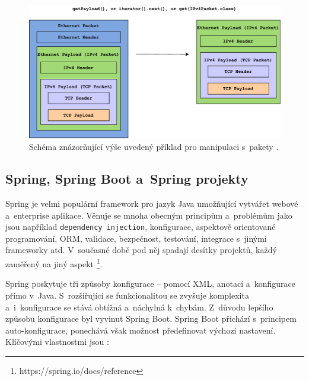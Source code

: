 \begin{figure}[!h]
  \centering
  \includegraphics[width=15cm]{template-fig/Pcap4JExample.pdf}
  \caption{Schéma znázorňující výše uvedený příklad pro manipulaci s~pakety \cite{gitPcap4J}.}
  \label{FIG_Pcap4JExample}
\end{figure}

\subsection{Spring, Spring Boot a~Spring projekty}
Spring je velmi populární framework pro jazyk Java umožňující vytvářet webové a~enterprise aplikace. Věnuje se mnoha obecným principům a~problémům jako jsou například \texttt{dependency injection}, konfigurace, aspektově orientované programování, ORM, validace, bezpečnost, testování, integrace s~jinými frameworky atd. V~současné době pod něj spadají desítky projektů, každý zaměřený na jiný aspekt \footnote{https://spring.io/docs/reference}.

Spring poskytuje tři způsoby konfigurace -- pomocí XML, anotací a~konfigurace přímo v~Java. S~rozšiřující se funkcionalitou se zvyšuje komplexita a~i~konfigurace se stává obtížná a~náchylná k~chybám. Z~důvodu lepšího způsobu konfigurace byl vyvinut Spring Boot. Spring Boot přichází s~principem auto-konfigurace, ponechává však možnost předefinovat výchozí nastavení. Klíčovými vlastnostmi jsou \cite{whySpringBoot}:


